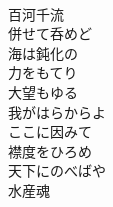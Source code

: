 \documentclass[10pt,b5j]{tarticle} %
\begin{document}
\begin{enumerate}
\begin{minipage}[c]{\blocksize}
    \end{minipage}
    \begin{minipage}[c]{\blocksize}
        
        \vspace{\linespace}
        \item~\\
        百河千流\\
        併せて呑めど\\
        海は鈍化の\\
        力をもてり\\
        大望もゆる\\
        我がはらからよ\\
        ここに因みて\\
        襟度をひろめ\\
        天下にのべばや\\
        水産魂
    
    \end{minipage}
\end{enumerate} %
\end{document}
